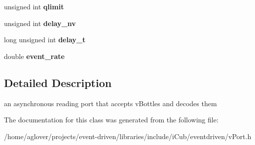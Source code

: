 \begin{DoxyCompactItemize}
\item 
unsigned int {\bfseries qlimit}\hypertarget{classev_1_1vGenReadPort_af85246c920ad7e5f8348a3d4169a0197}{}\label{classev_1_1vGenReadPort_af85246c920ad7e5f8348a3d4169a0197}

\item 
unsigned int {\bfseries delay\+\_\+nv}\hypertarget{classev_1_1vGenReadPort_a3d9c4e036a8ea1e3844689619409f7da}{}\label{classev_1_1vGenReadPort_a3d9c4e036a8ea1e3844689619409f7da}

\item 
long unsigned int {\bfseries delay\+\_\+t}\hypertarget{classev_1_1vGenReadPort_a7719ea3d0d325cf8d9bbc760a9058133}{}\label{classev_1_1vGenReadPort_a7719ea3d0d325cf8d9bbc760a9058133}

\item 
double {\bfseries event\+\_\+rate}\hypertarget{classev_1_1vGenReadPort_ac8fceb41f47a76a97ca69deaa9418427}{}\label{classev_1_1vGenReadPort_ac8fceb41f47a76a97ca69deaa9418427}

\end{DoxyCompactItemize}


\subsection{Detailed Description}
an asynchronous reading port that accepts v\+Bottles and decodes them 

The documentation for this class was generated from the following file\+:\begin{DoxyCompactItemize}
\item 
/home/aglover/projects/event-\/driven/libraries/include/i\+Cub/eventdriven/v\+Port.\+h\end{DoxyCompactItemize}
